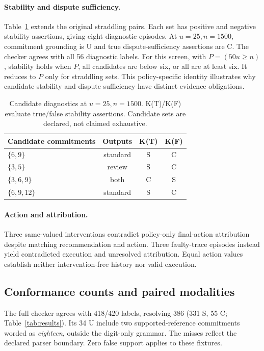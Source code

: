\documentclass[sigconf,nonacm]{acmart}
\begin{document}
\paragraph{Stability and dispute sufficiency.}
Table~\ref{tab:diagnostics} extends the original straddling pairs. Each set has positive and negative stability assertions, giving eight diagnostic episodes. At \(u=25,n=1500\), commitment grounding is U and true dispute-sufficiency assertions are C. The checker agrees with all 56 diagnostic labels. For this screen, with \(P=(50u\geq n)\), stability holds when \(P\), all candidates are below six, or all are at least six. It reduces to \(P\) only for straddling sets. This policy-specific identity illustrates why candidate stability and dispute sufficiency have distinct evidence obligations.

\begin{table}[t]
\caption{Candidate diagnostics at \(u=25,n=1500\). K(T)/K(F) evaluate true/false stability assertions. Candidate sets are declared, not claimed exhaustive.}
\label{tab:diagnostics}
\small
\begin{tabularx}{\columnwidth}{@{}Xccc@{}}
\toprule
Candidate commitments & Outputs & K(T) & K(F)\\
\midrule
$\{6,9\}$ & standard & S & C\\
$\{3,5\}$ & review & S & C\\
$\{3,6,9\}$ & both & C & S\\
$\{6,9,12\}$ & standard & S & C\\
\bottomrule
\end{tabularx}
\end{table}

\paragraph{Action and attribution.}
Three same-valued interventions contradict policy-only final-action attribution despite matching recommendation and action. Three faulty-trace episodes instead yield contradicted execution and unresolved attribution. Equal action values establish neither intervention-free history nor valid execution.

\subsection{Conformance counts and paired modalities}

The full checker agrees with 418/420 labels, resolving 386 (331 S, 55 C; Table~\ref{tab:results}). Its 34 U include two supported-reference commitments worded as \emph{eighteen}, outside the digit-only grammar. The misses reflect the declared parser boundary. Zero false support applies to these fixtures.
\end{document}
